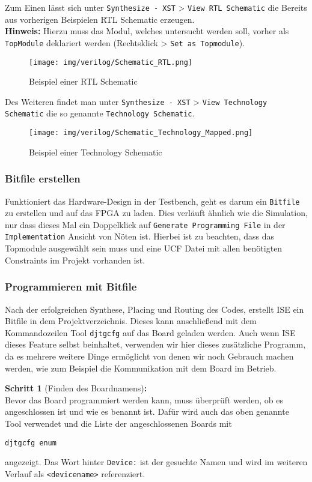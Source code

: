 Zum Einen lässt sich unter \texttt{Synthesize {-} XST} > \texttt{View RTL Schematic} die Bereits aus vorherigen Beispielen RTL Schematic erzeugen. \\
\textbf{Hinweis:} Hierzu muss das Modul, welches untersucht werden soll, vorher als \texttt{TopModule} deklariert werden (Rechtsklick > \texttt{Set as Topmodule}).

\begin{figure}[H]
	\centering
	\texttt{[image: img/verilog/Schematic\_RTL.png]}
	\caption{Beispiel einer RTL Schematic}
	\label{fig:rtl_schematic}
\end{figure}

Des Weiteren findet man unter \texttt{Synthesize {-} XST} > \texttt{View Technology Schematic} die so genannte \texttt{Technology Schematic}.

\begin{figure}[H]
	\centering
	\texttt{[image: img/verilog/Schematic\_Technology\_Mapped.png]}
	\caption{Beispiel einer Technology Schematic}
	\label{fig:tech_schematic}
\end{figure}

\subsubsection{Bitfile erstellen}
Funktioniert das Hardware-Design in der Testbench, geht es darum ein \texttt{Bitfile} zu erstellen und auf das FPGA zu laden. Dies verläuft ähnlich wie die Simulation, nur dass dieses Mal ein Doppelklick auf \texttt{Generate Programming File} in der \texttt{Implementation} Ansicht von Nöten ist. Hierbei ist zu beachten, dass das Topmodule ausgewählt sein muss und eine UCF Datei mit allen benötigten Constraints im Projekt vorhanden ist.


\subsubsection{Programmieren mit Bitfile}
Nach der erfolgreichen Synthese, Placing und Routing des Codes, erstellt ISE ein Bitfile in dem Projektverzeichnis. Dieses kann anschließend mit dem Kommandozeilen Tool \texttt{djtgcfg} auf das Board geladen werden. Auch wenn ISE dieses Feature selbst beinhaltet, verwenden wir hier dieses zusätzliche Programm, da es mehrere weitere Dinge ermöglicht von denen wir noch Gebrauch machen werden, wie zum Beispiel die Kommunikation mit dem Board im Betrieb.

\textbf{Schritt 1} (Finden des Boardnamens)\textbf{:}\\
Bevor das Board programmiert werden kann, muss überprüft werden, ob es angeschlossen ist und wie es benannt ist. Dafür wird auch das oben genannte Tool verwendet und die Liste der angeschlossenen Boards mit
\begin{center}
	\texttt{djtgcfg enum}
\end{center}
angezeigt. Das Wort hinter \texttt{Device:} ist der gesuchte Namen und wird im weiteren Verlauf als \texttt{<devicename>} referenziert. 

